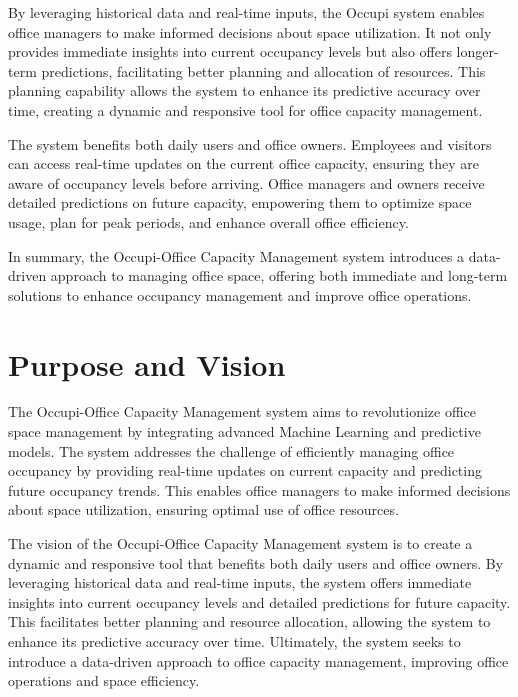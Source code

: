 \documentclass[11pt,a4paper]{article}
\begin{document}
By leveraging historical data and real-time inputs, the Occupi system enables office managers to make informed decisions about space utilization. It not only provides immediate insights into current occupancy levels but also offers longer-term predictions, facilitating better planning and allocation of resources. This planning capability allows the system to enhance its predictive accuracy over time, creating a dynamic and responsive tool for office capacity management.

The system benefits both daily users and office owners. Employees and visitors can access real-time updates on the current office capacity, ensuring they are aware of occupancy levels before arriving. Office managers and owners receive detailed predictions on future capacity, empowering them to optimize space usage, plan for peak periods, and enhance overall office efficiency.

In summary, the Occupi-Office Capacity Management system introduces a data-driven approach to managing office space, offering both immediate and long-term solutions to enhance occupancy management and improve office operations.

\section*{Purpose and Vision}
The Occupi-Office Capacity Management system aims to revolutionize office space management by integrating advanced Machine Learning and predictive models. The system addresses the challenge of efficiently managing office occupancy by providing real-time updates on current capacity and predicting future occupancy trends. This enables office managers to make informed decisions about space utilization, ensuring optimal use of office resources.

The vision of the Occupi-Office Capacity Management system is to create a dynamic and responsive tool that benefits both daily users and office owners. By leveraging historical data and real-time inputs, the system offers immediate insights into current occupancy levels and detailed predictions for future capacity. This facilitates better planning and resource allocation, allowing the system to enhance its predictive accuracy over time. Ultimately, the system seeks to introduce a data-driven approach to office capacity management, improving office operations and space efficiency.

\pagebreak
\end{document}
